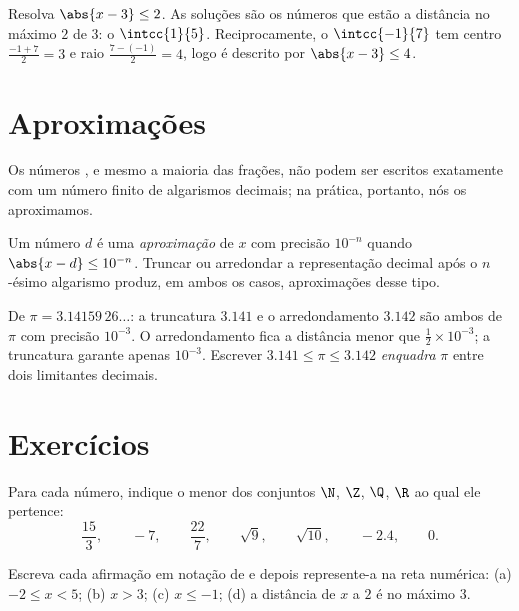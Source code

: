 \begin{example}\label{ex:g10:numbers:abs}
Resolva $\abs{x - 3} \leq 2$. As soluções são os números que estão a
distância no máximo $2$ de $3$: o  $\intcc{1}{5}$.
Reciprocamente, o  $\intcc{-1}{7}$ tem centro
$\frac{-1+7}{2} = 3$ e raio $\frac{7-(-1)}{2} = 4$, logo é descrito por
$\abs{x - 3} \leq 4$.
\end{example}

\section{Aproximações}

Os números , e mesmo a maioria das frações, não podem ser
escritos exatamente com um número finito de algarismos decimais; na
prática, portanto, nós os aproximamos.

\begin{definition}\label{def:g10:numbers:approx}
Um número $d$ é uma \emph{aproximação} de $x$ com
precisão $10^{-n}$ quando $\abs{x - d} \leq 10^{-n}$. Truncar ou
arredondar a representação decimal após o $n$-ésimo algarismo produz, em
ambos os casos, aproximações desse tipo.
\end{definition}

\begin{example}
De $\pi = 3.14159\,26\dots$: a truncatura $3.141$ e o arredondamento
$3.142$ são ambos  de $\pi$ com precisão $10^{-3}$. O
arredondamento fica a distância menor que $\frac12 \times 10^{-3}$; a
truncatura garante apenas $10^{-3}$. Escrever
$3.141 \leq \pi \leq 3.142$ \emph{enquadra} $\pi$ entre dois limitantes
decimais.
\end{example}

\section{Exercícios}

\begin{exercise}[$\star$]\label{exo:g10:numbers:1}
Para cada número, indique o menor dos conjuntos $\N$, $\Z$, $\Q$, $\R$ ao
qual ele pertence:
\[
\frac{15}{3}, \qquad -7, \qquad \frac{22}{7}, \qquad \sqrt{9}, \qquad
\sqrt{10}, \qquad -2.4, \qquad 0 .
\]
\end{exercise}

\begin{exercise}[$\star$]\label{exo:g10:numbers:2}
Escreva cada afirmação em notação de  e depois represente-a na
reta numérica: (a) $-2 \leq x < 5$; (b) $x > 3$; (c) $x \leq -1$;
(d) a distância de $x$ a $2$ é no máximo $3$.
\end{exercise}

